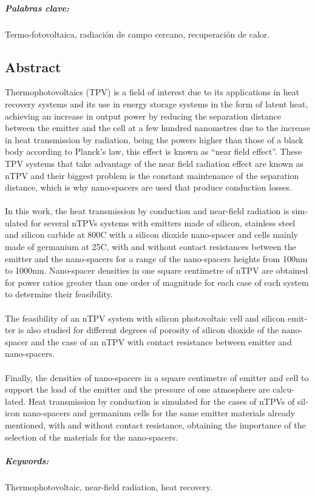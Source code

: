 \paragraph{Palabras clave:} Termo-fotovoltaica, radiación de campo cercano, recuperación de calor.
\begin{otherlanguage}{british}
\chapter{Abstract}

Thermophotovoltaics (TPV) is a field of interest due to its applications in heat recovery systems and its use in energy storage systems in the form of latent heat, achieving an increase in output power by reducing the separation distance between the emitter and the cell at a few hundred nanometres due to the increase in heat transmission by radiation, being the powers higher than those of a black body according to Planck's law, this effect is known as ``near field effect''. These TPV systems that take advantage of the near field radiation effect are known as nTPV and their biggest problem is the constant maintenance of the separation distance, which is why nano-spacers are used that produce conduction losses.\\\\
In this work, the heat transmission by conduction and near-field radiation is simulated for several nTPVs systems with emitters made of silicon, stainless steel and silicon carbide at 800\textdegree C with a silicon dioxide nano-spacer and cells mainly made of germanium at 25\textdegree C, with and without contact resistances between the emitter and the nano-spacers for a range of the nano-spacers heights from 100nm to 1000nm. Nano-spacer densities in one square centimetre of nTPV are obtained for power ratios greater than one order of magnitude for each case of each system to determine their feasibility.\\\\
The feasibility of an nTPV system with silicon photovoltaic cell and silicon emitter is also studied for different degrees of porosity of silicon dioxide of the nano-spacer and the case of an nTPV with contact resistance between emitter and nano-spacers.\\\\
Finally, the densities of nano-spacers in a square centimetre of emitter and cell to support the load of the emitter and the pressure of one atmosphere are calculated. Heat transmission by conduction is simulated for the cases of nTPVs of silicon nano-spacers and germanium cells for the same emitter materials already mentioned, with and without contact resistance, obtaining the importance of the selection of the materials for the nano-spacers.

\paragraph{Keywords:} Thermophotovoltaic, near-field radiation, heat recovery.
\end{otherlanguage}